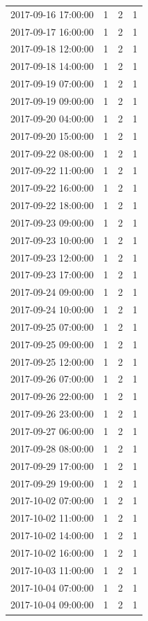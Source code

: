 \begin{tabular}{lrrr}
2017-09-16 17:00:00 & 1 & 2 & 1 \\
2017-09-17 16:00:00 & 1 & 2 & 1 \\
2017-09-18 12:00:00 & 1 & 2 & 1 \\
2017-09-18 14:00:00 & 1 & 2 & 1 \\
2017-09-19 07:00:00 & 1 & 2 & 1 \\
2017-09-19 09:00:00 & 1 & 2 & 1 \\
2017-09-20 04:00:00 & 1 & 2 & 1 \\
2017-09-20 15:00:00 & 1 & 2 & 1 \\
2017-09-22 08:00:00 & 1 & 2 & 1 \\
2017-09-22 11:00:00 & 1 & 2 & 1 \\
2017-09-22 16:00:00 & 1 & 2 & 1 \\
2017-09-22 18:00:00 & 1 & 2 & 1 \\
2017-09-23 09:00:00 & 1 & 2 & 1 \\
2017-09-23 10:00:00 & 1 & 2 & 1 \\
2017-09-23 12:00:00 & 1 & 2 & 1 \\
2017-09-23 17:00:00 & 1 & 2 & 1 \\
2017-09-24 09:00:00 & 1 & 2 & 1 \\
2017-09-24 10:00:00 & 1 & 2 & 1 \\
2017-09-25 07:00:00 & 1 & 2 & 1 \\
2017-09-25 09:00:00 & 1 & 2 & 1 \\
2017-09-25 12:00:00 & 1 & 2 & 1 \\
2017-09-26 07:00:00 & 1 & 2 & 1 \\
2017-09-26 22:00:00 & 1 & 2 & 1 \\
2017-09-26 23:00:00 & 1 & 2 & 1 \\
2017-09-27 06:00:00 & 1 & 2 & 1 \\
2017-09-28 08:00:00 & 1 & 2 & 1 \\
2017-09-29 17:00:00 & 1 & 2 & 1 \\
2017-09-29 19:00:00 & 1 & 2 & 1 \\
2017-10-02 07:00:00 & 1 & 2 & 1 \\
2017-10-02 11:00:00 & 1 & 2 & 1 \\
2017-10-02 14:00:00 & 1 & 2 & 1 \\
2017-10-02 16:00:00 & 1 & 2 & 1 \\
2017-10-03 11:00:00 & 1 & 2 & 1 \\
2017-10-04 07:00:00 & 1 & 2 & 1 \\
2017-10-04 09:00:00 & 1 & 2 & 1 \\

\end{tabular}
